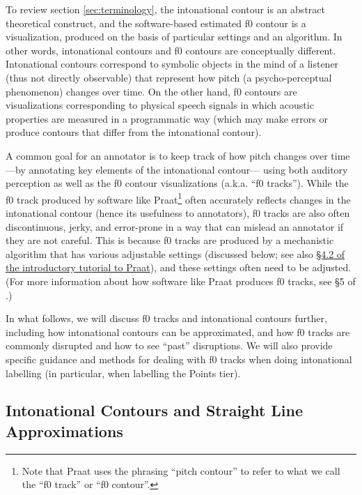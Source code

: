 \documentclass[11pt, twoside]{memoir}
\begin{document}
To review section \ref{sec:terminology}, the intonational contour is an abstract theoretical construct, and the software-based estimated f0 contour is a visualization, produced on the basis of particular settings and an algorithm. In other words, intonational contours and f0 contours are conceptually different. Intonational contours correspond to symbolic objects in the mind of a listener (thus not directly observable) that represent how pitch (a psycho-perceptual phenomenon) changes over time. On the other hand, f0 contours are visualizations corresponding to physical speech signals in which acoustic properties are measured in a programmatic way (which may make errors or produce contours that differ from the intonational contour).

A common goal for an annotator is to keep track of how pitch changes over time —by annotating key elements of the intonational contour— using both auditory perception as well as the f0 contour visualizations (a.k.a. “f0 tracks”). While the f0 track produced by software like Praat\footnote{Note that Praat uses the phrasing “pitch contour” to refer to what we call the “f0 track” or “f0 contour”.} often accurately reflects changes in the intonational contour (hence its usefulness to annotators), f0 tracks are also often discontinuous, jerky, and error-prone in a way that can mislead an annotator if they are not careful. This is because f0 tracks are produced by a mechanistic algorithm that has various adjustable settings (discussed below; see also \href{https://www.fon.hum.uva.nl/praat/manual/Intro_4_2__Configuring_the_pitch_contour.html}{§4.2 of the introductory tutorial to Praat}), and these settings often need to be adjusted. (For more information about how software like Praat produces f0 tracks, see §5 of \citealt{weenink20}.)

In what follows, we will discuss f0 tracks and intonational contours further, including how intonational contours can be approximated, and how f0 tracks are commonly disrupted and how to see “past” disruptions. We will also provide specific guidance and methods for dealing with f0 tracks when doing intonational labelling (in particular, when labelling the Points tier).


\subsection{Intonational Contours and Straight Line Approximations}\label{sec:intonational-contours-and-straight-line-approximations}
\end{document}
